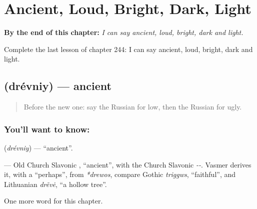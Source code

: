 
\chapter{Ancient, Loud, Bright, Dark, Light}
\label{ch:ru-ancient-loud-bright-dark-light}

\begin{chapteropening}
\textbf{By the end of this chapter:} \emph{I can say ancient, loud, bright, dark and light.}

Complete the last lesson of chapter 244: I can say ancient, loud, bright, dark and light.
\end{chapteropening}

\section[\texorpdfstring{\ru{древний} (drévniy)}{древний (drévniy)}]{ (drévniy) — ancient}

\label{lesson:RU-C244-drevniy}



\begin{quote}
Before the new one: say the Russian for low, then the Russian for ugly.
\end{quote}

\subsection*{You'll want to know: }
\textbf{} (\emph{drévniy}) — \textquotedblleft{}ancient\textquotedblright{}.

\begin{cousinweb}
\textbf{} — Old Church Slavonic \emph{}, \textquotedblleft{}ancient\textquotedblright{}, with the Church Slavonic \emph{--}. Vasmer derives it, with a \textquotedblleft{}perhaps\textquotedblright{}, from \emph{*drewos}, compare Gothic \emph{triggws}, \textquotedblleft{}faithful\textquotedblright{}, and Lithuanian \emph{drẽvė}, \textquotedblleft{}a hollow tree\textquotedblright{}.
\end{cousinweb}

\begin{grammarlens}[title={What you've built}]
One more word for this chapter.
\end{grammarlens}

